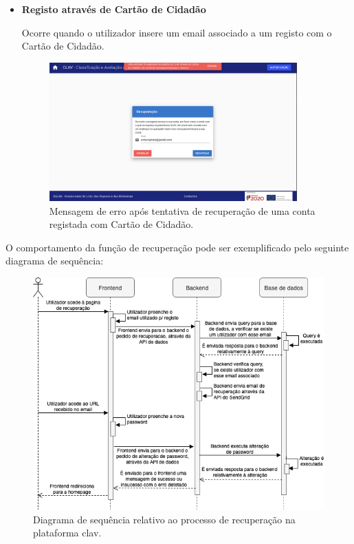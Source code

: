 \begin{itemize}
\begin{itemize}
        \vspace{-5mm}
        \item \textbf{Registo através de Cartão de Cidadão}
        
        Ocorre quando o utilizador insere um email associado a um registo com o Cartão de Cidadão.
    
        \vspace{-2mm}
        \begin{figure}[H]
            \centering
            \includegraphics[width=0.9\textwidth]{img/clav/authCC/erroRecuperacao.png}
            \caption{Mensagem de erro após tentativa de recuperação de uma conta registada com Cartão de Cidadão.}
            \label{fig:pagRecuperacaoErroCC}
        \end{figure}
    \end{itemize}
\end{itemize}

O comportamento da função de recuperação pode ser exemplificado pelo seguinte diagrama de sequência:

\vspace{10mm}

\begin{figure}[H]
    \centering
    \includegraphics[width=\textwidth]{img/diagramas/sequencia/DiagramasSequencia-Recuperacao.png}
    \caption{Diagrama de sequência relativo ao processo de recuperação na plataforma \gls{clav}.}
    \label{fig:diagramaSequenciaRecuperacao}
\end{figure}

